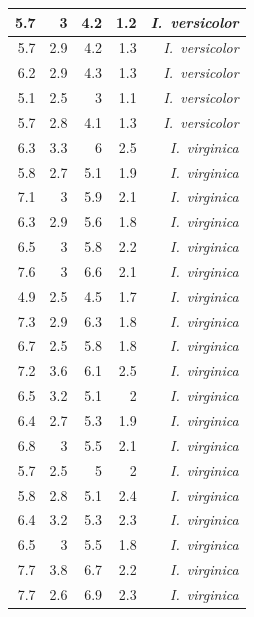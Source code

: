 \begin{enumerate}
\begin{center}
\begin{longtable}{|r|r|r|r|r|}
				\hline
				5.7   & 3     & 4.2   & 1.2   & \textit{I. versicolor} \\
				\hline
				5.7   & 2.9   & 4.2   & 1.3   & \textit{I. versicolor} \\
				\hline
				6.2   & 2.9   & 4.3   & 1.3   & \textit{I. versicolor} \\
				\hline
				5.1   & 2.5   & 3     & 1.1   & \textit{I. versicolor} \\
				\hline
				5.7   & 2.8   & 4.1   & 1.3   & \textit{I. versicolor} \\
				\hline
				6.3   & 3.3   & 6     & 2.5   & \textit{I. virginica} \\
				\hline
				5.8   & 2.7   & 5.1   & 1.9   & \textit{I. virginica} \\
				\hline
				7.1   & 3     & 5.9   & 2.1   & \textit{I. virginica} \\
				\hline
				6.3   & 2.9   & 5.6   & 1.8   & \textit{I. virginica} \\
				\hline
				6.5   & 3     & 5.8   & 2.2   & \textit{I. virginica} \\
				\hline
				7.6   & 3     & 6.6   & 2.1   & \textit{I. virginica} \\
				\hline
				4.9   & 2.5   & 4.5   & 1.7   & \textit{I. virginica} \\
				\hline
				7.3   & 2.9   & 6.3   & 1.8   & \textit{I. virginica} \\
				\hline
				6.7   & 2.5   & 5.8   & 1.8   & \textit{I. virginica} \\
				\hline
				7.2   & 3.6   & 6.1   & 2.5   & \textit{I. virginica} \\
				\hline
				6.5   & 3.2   & 5.1   & 2     & \textit{I. virginica} \\
				\hline
				6.4   & 2.7   & 5.3   & 1.9   & \textit{I. virginica} \\
				\hline
				6.8   & 3     & 5.5   & 2.1   & \textit{I. virginica} \\
				\hline
				5.7   & 2.5   & 5     & 2     & \textit{I. virginica} \\
				\hline
				5.8   & 2.8   & 5.1   & 2.4   & \textit{I. virginica} \\
				\hline
				6.4   & 3.2   & 5.3   & 2.3   & \textit{I. virginica} \\
				\hline
				6.5   & 3     & 5.5   & 1.8   & \textit{I. virginica} \\
				\hline
				7.7   & 3.8   & 6.7   & 2.2   & \textit{I. virginica} \\
				\hline
				7.7   & 2.6   & 6.9   & 2.3   & \textit{I. virginica} \\

\end{longtable}
\end{center}
\end{enumerate}
